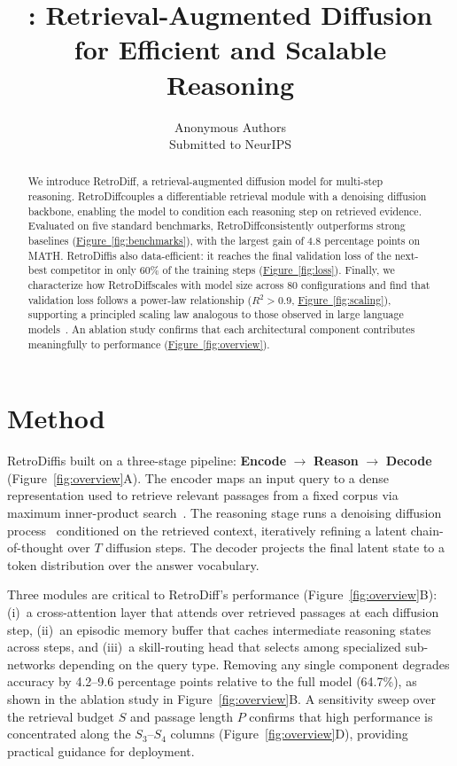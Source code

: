 \documentclass[11pt]{article}
\title{\textbf{\methodname}: Retrieval-Augmented Diffusion\\
       for Efficient and Scalable Reasoning}
\author{Anonymous Authors\\
        \small Submitted to NeurIPS}
\date{}
\newcommand{\methodname}{RetroDiff}
\begin{document}
\maketitle

\begin{abstract}
We introduce \methodname, a retrieval-augmented diffusion model for multi-step reasoning.
\methodname couples a differentiable retrieval module with a denoising diffusion backbone,
enabling the model to condition each reasoning step on retrieved evidence.
Evaluated on five standard benchmarks, \methodname consistently outperforms strong baselines
(\hyperref[fig:benchmarks]{Figure~\ref*{fig:benchmarks}}), with the largest gain of 4.8 percentage points on MATH.
\methodname is also data-efficient: it reaches the final validation loss of the next-best
competitor in only 60\% of the training steps
(\hyperref[fig:loss]{Figure~\ref*{fig:loss}}).
Finally, we characterize how \methodname scales with model size across 80 configurations
and find that validation loss follows a power-law relationship ($R^2 > 0.9$,
\hyperref[fig:scaling]{Figure~\ref*{fig:scaling}}), supporting a principled scaling law
analogous to those observed in large language models~\citep{kaplan2020scaling}.
An ablation study confirms that each architectural component contributes meaningfully to
performance (\hyperref[fig:overview]{Figure~\ref*{fig:overview}}).
\end{abstract}

\section{Method}
\label{sec:method}

\methodname is built on a three-stage pipeline:
\textbf{Encode} $\to$ \textbf{Reason} $\to$ \textbf{Decode}
(Figure~\ref{fig:overview}A).
The encoder maps an input query to a dense representation used to retrieve relevant
passages from a fixed corpus via maximum inner-product search~\citep{zhang2024retrieval}.
The reasoning stage runs a denoising diffusion process~\citep{ho2020denoising} conditioned
on the retrieved context, iteratively refining a latent chain-of-thought over $T$ diffusion
steps.
The decoder projects the final latent state to a token distribution over the answer
vocabulary.

Three modules are critical to \methodname's performance (Figure~\ref{fig:overview}B):
(i)~a cross-attention layer that attends over retrieved passages at each diffusion step,
(ii)~an episodic memory buffer that caches intermediate reasoning states across steps, and
(iii)~a skill-routing head that selects among specialized sub-networks depending on the
query type.
Removing any single component degrades accuracy by 4.2--9.6 percentage points relative to
the full model (64.7\%), as shown in the ablation study in Figure~\ref{fig:overview}B.
A sensitivity sweep over the retrieval budget $S$ and passage length $P$ confirms that
high performance is concentrated along the $S_3$--$S_4$ columns (Figure~\ref{fig:overview}D),
providing practical guidance for deployment.
\end{document}
